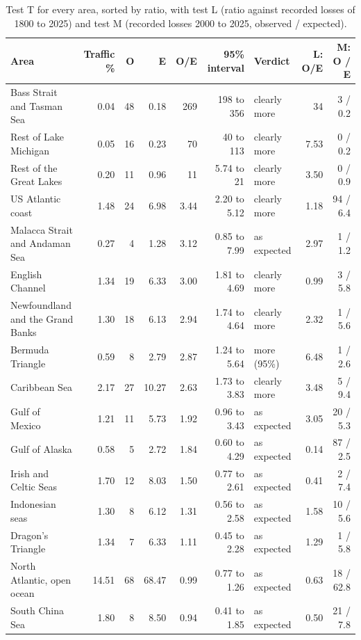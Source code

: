 \documentclass[11pt,a4paper]{article}
\begin{document}
\begin{table}[tbp]\centering\scriptsize\caption{Test T for every area, sorted by ratio, with test L (ratio against recorded losses of 1800 to 2025) and test M (recorded losses 2000 to 2025, observed / expected).}\label{tab:areas}\begin{tabular}{p{4.0cm}rrrrrlrr}\toprule Area & Traffic \% & O & E & O/E & 95\% interval & Verdict & L: O/E & M: O / E\\\midrule
Bass Strait and Tasman Sea & 0.04 & 48 & 0.18 & 269 & 198 to 356 & clearly more & 34 & 3 / 0.2\\
Rest of Lake Michigan & 0.05 & 16 & 0.23 & 70 & 40 to 113 & clearly more & 7.53 & 0 / 0.2\\
Rest of the Great Lakes & 0.20 & 11 & 0.96 & 11 & 5.74 to 21 & clearly more & 3.50 & 0 / 0.9\\
US Atlantic coast & 1.48 & 24 & 6.98 & 3.44 & 2.20 to 5.12 & clearly more & 1.18 & 94 / 6.4\\
Malacca Strait and Andaman Sea & 0.27 & 4 & 1.28 & 3.12 & 0.85 to 7.99 & as expected & 2.97 & 1 / 1.2\\
English Channel & 1.34 & 19 & 6.33 & 3.00 & 1.81 to 4.69 & clearly more & 0.99 & 3 / 5.8\\
Newfoundland and the Grand Banks & 1.30 & 18 & 6.13 & 2.94 & 1.74 to 4.64 & clearly more & 2.32 & 1 / 5.6\\
Bermuda Triangle & 0.59 & 8 & 2.79 & 2.87 & 1.24 to 5.64 & more (95\%) & 6.48 & 1 / 2.6\\
Caribbean Sea & 2.17 & 27 & 10.27 & 2.63 & 1.73 to 3.83 & clearly more & 3.48 & 5 / 9.4\\
Gulf of Mexico & 1.21 & 11 & 5.73 & 1.92 & 0.96 to 3.43 & as expected & 3.05 & 20 / 5.3\\
Gulf of Alaska & 0.58 & 5 & 2.72 & 1.84 & 0.60 to 4.29 & as expected & 0.14 & 87 / 2.5\\
Irish and Celtic Seas & 1.70 & 12 & 8.03 & 1.50 & 0.77 to 2.61 & as expected & 0.41 & 2 / 7.4\\
Indonesian seas & 1.30 & 8 & 6.12 & 1.31 & 0.56 to 2.58 & as expected & 1.58 & 10 / 5.6\\
Dragon's Triangle & 1.34 & 7 & 6.33 & 1.11 & 0.45 to 2.28 & as expected & 1.29 & 1 / 5.8\\
North Atlantic, open ocean & 14.51 & 68 & 68.47 & 0.99 & 0.77 to 1.26 & as expected & 0.63 & 18 / 62.8\\
South China Sea & 1.80 & 8 & 8.50 & 0.94 & 0.41 to 1.85 & as expected & 0.50 & 21 / 7.8\\

\end{tabular}
\end{table}
\end{document}
